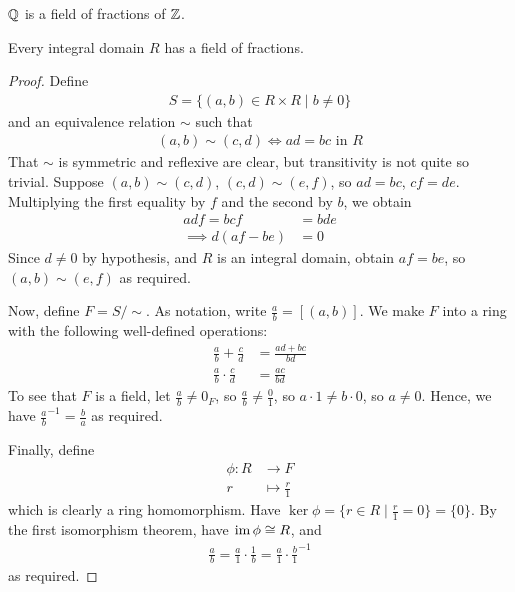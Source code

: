 \documentclass{../../template/note}
\begin{document}
    \begin{example*}
        $\mathbb Q$ is a field of fractions of $\mathbb Z$.
    \end{example*}
    
    \begin{theorem}
        Every integral domain $R$ has a field of fractions.
    \end{theorem}

    \begin{proof}
        Define
        \begin{align*}
            S = \{(a, b) \in R \times R \mid b \neq 0\}
        \end{align*}
        and an equivalence relation $\sim$ such that
        \begin{align*}
            (a, b) \sim (c, d) \iff ad = bc \text{ in } R
        \end{align*}
        That $\sim$ is symmetric and reflexive are clear, but transitivity is not quite so trivial. Suppose $(a, b) \sim (c, d)$, $(c, d) \sim (e, f)$, so $ad = bc$, $cf = de$. Multiplying the first equality by $f$ and the second by $b$, we obtain
        \begin{align*}
            adf = bcf &= bde \\
            \implies d(af-be) &= 0
        \end{align*}
        Since $d \neq 0$ by hypothesis, and $R$ is an integral domain, obtain $af = be$, so $(a, b) \sim (e, f)$ as required.
        
        Now, define $F = S/\sim$. As notation, write $\frac ab = [(a, b)]$. We make $F$ into a ring with the following well-defined operations:
        \begin{align*}
            \frac a b + \frac c d &= \frac{ad+bc}{bd} \\
            \frac a b \cdot \frac c d &= \frac{ac}{bd}
        \end{align*}
        To see that $F$ is a field, let $\frac a b \neq 0_F$, so $\frac a b \neq \frac 0 1$, so $a \cdot 1 \neq b \cdot 0$, so $a \neq 0$. Hence, we have ${\frac a b}^{-1} = \frac b a$ as required.

        Finally, define
        \begin{align*}
            \phi: R &\to F \\
            r &\mapsto \frac r 1
        \end{align*}
        which is clearly a ring homomorphism. Have $\ker \phi = \{r \in R \mid \frac r 1 = 0\} = \{0\}$. By the first isomorphism theorem, have $\operatorname{im} \phi \cong R$, and
        \begin{align*}
            \frac a b = \frac a 1 \cdot \frac 1 b = \frac a 1 \cdot {\frac b 1}^{-1}
        \end{align*}
        as required.
    \end{proof}
    
\end{document}
